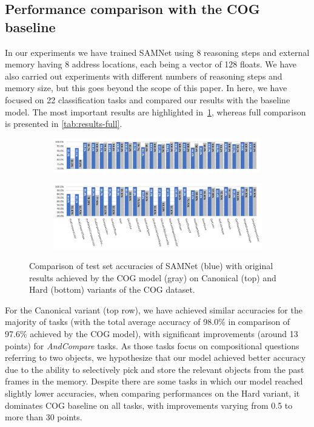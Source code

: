 \subsection{Performance comparison with the COG baseline}

In our experiments we have trained SAMNet using 8 reasoning steps and external memory having 8 address locations, each being a vector of 128 floats.
We have also carried out experiments with different numbers of reasoning steps and memory size, but this goes beyond the scope of this paper.
In here, we have focused on 22 classification tasks and compared our results with the baseline model.
The most important results are highlighted in~\cref{fig:samnet_cog_detailed}, whereas full comparison is presented in \cref{tab:results-full}.

\begin{figure}[htbp]
	\centering
  \begin{subfigure}{\textwidth}
    \includegraphics[width=0.99\textwidth]{../results/samnet_cog_orig_canonical_no_labels.png}
  \end{subfigure}%
  \newline
  \begin{subfigure}{\textwidth}
	\includegraphics[width=\textwidth]{../results/samnet_cog_orig_hard.png}
  \end{subfigure}%
\caption{Comparison of test set accuracies of SAMNet (blue) with original results achieved by the COG model (gray) on Canonical (top) and Hard (bottom) variants of the COG dataset.}
\label{fig:samnet_cog_detailed}
\end{figure}


For the Canonical variant (top row), we have achieved similar accuracies for the majority of tasks (with the total average accuracy of 98.0\% in comparison of 97.6\% achieved by the COG model), with significant improvements (around 13 points) for \textit{AndCompare} tasks.
As those tasks focus on compositional questions referring to two objects, we hypothesize that our model achieved better accuracy due to the ability to selectively pick and store the relevant objects from the past frames in the memory.
Despite there are some tasks in which our model reached slightly lower accuracies,
when comparing performances on the Hard variant, it dominates COG baseline on all tasks, with improvements varying from 0.5 to more than 30 points.


